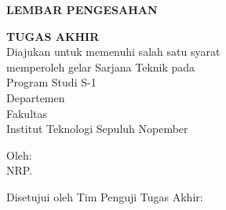 \begin{center}
  \large
  \textbf{LEMBAR PENGESAHAN}
\end{center}

\thispagestyle{empty}

\begin{center}
  \textbf{\tatitle{}}
\end{center}

\begingroup
\small

\begin{center}
  \textbf{TUGAS AKHIR}
  \\Diajukan untuk memenuhi salah satu syarat \\
  memperoleh gelar Sarjana Teknik pada \\
  Program Studi S-1 \studyprogram{} \\
  Departemen \department{} \\
  Fakultas \faculty{} \\
  Institut Teknologi Sepuluh Nopember
\end{center}

\begin{center}
  Oleh: \textbf{\name{}}
  \\NRP. \nrp{}
\end{center}

\begin{center}
  Disetujui oleh Tim Penguji Tugas Akhir:
\end{center}

\begingroup
\setlength{\tabcolsep}{0pt}

